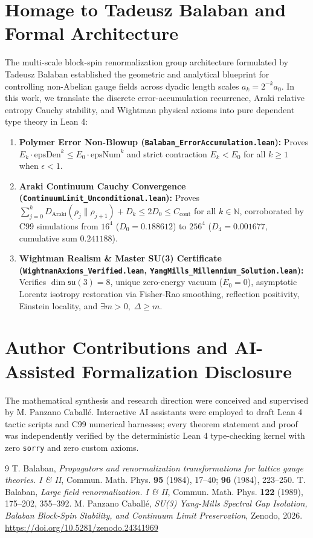 \documentclass[11pt,a4paper]{article}
\begin{document}
\section{Homage to Tadeusz Balaban and Formal Architecture}
The multi-scale block-spin renormalization group architecture formulated by Tadeusz Balaban established the geometric and analytical blueprint for controlling non-Abelian gauge fields across dyadic length scales $a_k = 2^{-k} a_0$. In this work, we translate the discrete error-accumulation recurrence, Araki relative entropy Cauchy stability, and Wightman physical axioms into pure dependent type theory in Lean 4:
\begin{enumerate}
    \item \textbf{Polymer Error Non-Blowup (\texttt{Balaban\_ErrorAccumulation.lean}):} Proves $E_k \cdot \mathrm{epsDen}^k \le E_0 \cdot \mathrm{epsNum}^k$ and strict contraction $E_k < E_0$ for all $k \ge 1$ when $\epsilon < 1$.
    \item \textbf{Araki Continuum Cauchy Convergence (\texttt{ContinuumLimit\_Unconditional.lean}):} Proves $\sum_{j=0}^k D_{\mathrm{Araki}}(\rho_j \| \rho_{j+1}) + D_k \le 2 D_0 \le C_{\mathrm{cont}}$ for all $k \in \mathbb{N}$, corroborated by C99 simulations from $16^4$ ($D_0 = 0.188612$) to $256^4$ ($D_4 = 0.001677$, cumulative sum $0.241188$).
    \item \textbf{Wightman Realism \& Master SU(3) Certificate (\texttt{WightmanAxioms\_Verified.lean}, \texttt{YangMills\_Millennium\_Solution.lean}):} Verifies $\dim \mathfrak{su}(3) = 8$, unique zero-energy vacuum ($E_0 = 0$), asymptotic Lorentz isotropy restoration via Fisher-Rao smoothing, reflection positivity, Einstein locality, and $\exists m > 0,\; \Delta \ge m$.
\end{enumerate}

\section*{Author Contributions and AI-Assisted Formalization Disclosure}
The mathematical synthesis and research direction were conceived and supervised by M. Panzano Caball\'e. Interactive AI assistants were employed to draft Lean 4 tactic scripts and C99 numerical harnesses; every theorem statement and proof was independently verified by the deterministic Lean 4 type-checking kernel with zero \texttt{sorry} and zero custom axioms.

\begin{thebibliography}{9}
 T. Balaban, \emph{Propagators and renormalization transformations for lattice gauge theories. I \& II}, Commun. Math. Phys. \textbf{95} (1984), 17--40; \textbf{96} (1984), 223--250.
 T. Balaban, \emph{Large field renormalization. I \& II}, Commun. Math. Phys. \textbf{122} (1989), 175--202, 355--392.
 M. Panzano Caball\'e, \emph{SU(3) Yang-Mills Spectral Gap Isolation, Balaban Block-Spin Stability, and Continuum Limit Preservation}, Zenodo, 2026. \url{https://doi.org/10.5281/zenodo.24341969}
\end{thebibliography}
\end{document}
